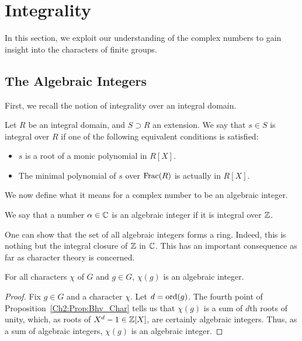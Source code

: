 \section{Integrality}

In this section, we exploit our understanding of the complex numbers to gain insight into the characters of finite groups.

\subsection{The Algebraic Integers}

First, we recall the notion of integrality over an integral domain.

\begin{boxdefinition}[Integrality]
    Let $R$ be an integral domain, and $S \supset R$ an extension. We say that $s \in S$ is integral over $R$ if one of the following equivalent conditions is satisfied:
    \begin{itemize}
        \item $s$ is a root of a monic polynomial in $R[X]$.
        \item The minimal polynomial of $s$ over $\operatorname{Frac}\!\left( R \right)$ is actually in $R[X]$.
    \end{itemize}
\end{boxdefinition}

We now define what it means for a complex number to be an algebraic integer.

\begin{boxdefinition}
    We say that a number $\alpha \in \mathbb{C}$ is an algebraic integer if it is integral over $\mathbb{Z}$.
\end{boxdefinition}

One can show that the set of all algebraic integers forms a ring. Indeed, this is nothing but the integral closure of $\mathbb{Z}$ in $\mathbb{C}$. This has an important consequence as far as character theory is concerned.

\begin{proposition}\label{Ch2:Prop:Char_Val_Alg_Int}
    For all characters $\chi$ of $G$ and $g \in G$, $\chi(g)$ is an algebraic integer.
\end{proposition}
\begin{proof}
    Fix $g \in G$ and a character $\chi$. Let $d = \operatorname{ord}\!\left( g \right)$. The fourth point of Proposition~\ref{Ch2:Prop:Bhv_Char} tells us that $\chi(g)$ is a sum of $d$th roots of unity, which, as roots of $X^d - 1 \in \mathbb{Z}[X]$, are certainly algebraic integers. Thus, as a sum of algebraic integers, $\chi(g)$ is an algebraic integer. 
\end{proof}

